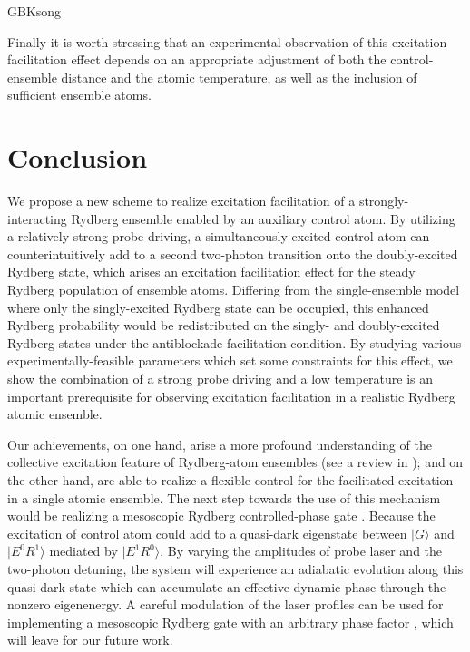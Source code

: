 \documentclass{cpbtex}
\begin{document}
\begin{CJK*}{GBK}{song}
 
 Finally it is worth stressing that an experimental observation of this excitation facilitation effect depends on an appropriate adjustment of both the control-ensemble distance and the atomic temperature, as well as the inclusion of sufficient ensemble atoms.  
 
 
 \section{Conclusion}
 
 We propose a new scheme to realize excitation facilitation of a strongly-interacting Rydberg ensemble enabled by an auxiliary control atom. By utilizing a relatively strong probe driving, a simultaneously-excited control atom can counterintuitively add to a second two-photon transition onto the doubly-excited Rydberg state, which arises an excitation facilitation effect for
 the steady Rydberg population of ensemble atoms. Differing from the single-ensemble model where only the singly-excited Rydberg state can be occupied, this enhanced Rydberg probability would be redistributed on the singly- and doubly-excited Rydberg states under the antiblockade facilitation condition.
 By studying various experimentally-feasible parameters which set some constraints for this effect, we show the combination of a strong probe driving and a low temperature is an important prerequisite for observing excitation facilitation in a realistic Rydberg atomic ensemble.

 Our achievements, on one hand, arise a more profound understanding of the collective excitation feature of Rydberg-atom ensembles (see a review in \cite{Browaeys2020}); and on the other hand, are able to realize a flexible control for the facilitated excitation in a single atomic ensemble. The next step towards the use of this mechanism would be realizing a mesoscopic Rydberg controlled-phase gate \cite{Yin:21}. Because the excitation of control atom could add to a quasi-dark eigenstate between $|G\rangle$ and $|E^0R^1\rangle$ mediated by $|E^1R^0\rangle$. By varying the amplitudes of probe laser and the two-photon detuning, the system will experience an adiabatic evolution along this quasi-dark state which can accumulate an effective dynamic phase through the nonzero eigenenergy. A careful modulation of the laser profiles can be used for implementing a mesoscopic Rydberg gate with an arbitrary phase factor \cite{PhysRevApplied.18.044042,PhysRevApplied.13.024059,PhysRevA.101.062309}, which will leave for our future work.





\end{CJK*}
\end{document}
